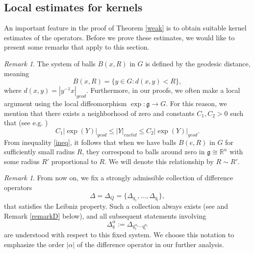 \documentclass[12pt, reqno]{amsart}
\theoremstyle{definition}
\theoremstyle{remark}
\newtheorem{remark}[theorem]{Remark}
\numberwithin{equation}{section}
\begin{document}
\subsection{Local estimates for kernels} An important feature in the proof of Theorem \ref{weak} is to obtain suitable kernel estimates of the operators. Before we prove these estimates, we would like to present some remarks that apply to this section. 
\begin{remark}
   The system of balls $B(x,R)$ in $G$ is defined by the geodesic distance, meaning 
\begin{equation*}
    B(x,R)=\{y\in G:d(x,y)<R\},
\end{equation*}
where $d(x,y)=|y^{-1}x|_{geod}$. Furthermore, in our proofs, we often make a local argument using the local diffeomorphism $\exp\colon\mathfrak{g}\to G$. For this reason, we mention that there exists a neighborhood of zero and constants $C_1,C_2>0$ such that (see e.g. \cite[Page 2894]{RT:JFA:2011})
\begin{equation}\label{ineq}
    C_1|\exp(Y)|_{geod}\leq|Y|_{euclid}\leq C_2|\exp(Y)|_{geod}.
\end{equation}
From inequality \eqref{ineq}, it follows that when we have balls $B(e,R)$ in $G$ for sufficiently small radius $R$, they correspond to balls around zero in $\mathfrak{g}\cong\mathbb{R}^n$ with some radius $R'$ proportional to $R$. We will denote this relationship by $R\sim R'$. 
\end{remark}
\begin{remark}\label{Remark:diff:op}
   From now on, we fix a strongly admissible collection of difference operators
\[
\Delta = \Delta_Q = \{\Delta_{q_1}, \dots, \Delta_{q_l}\},
\]
that satisfies the Leibniz property. Such a collection always exists (see \cite[Corollary 5.13]{12} and Remark \ref{remarkD} below), and all subsequent statements involving $$ \Delta_q^\alpha:= \Delta_{q^{\alpha_1}_1\cdots q^{\alpha_l}_l }$$ are understood with respect to this fixed system.  We choose this notation to emphasize the order $|\alpha|$ of the difference operator in our further analysis.
\end{remark}
\end{document}
